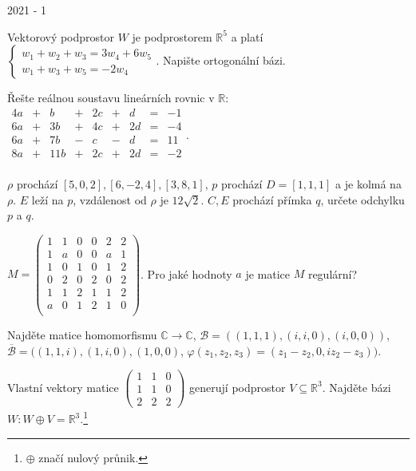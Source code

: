 
\newpage
{\large 2021 - 1}

\begin{questions}

\question Vektorový podprostor \(W\) je podprostorem \(\mathbb{R}^5\) a platí \(\left\{
    \begin{array}{l}
        w_1 + w_2 + w_3 = 3w_4 + 6w_5\\
        w_1 + w_3 + w_5 = -2w_4
    \end{array}
\right.\). Napište ortogonální bázi.

\question Řešte reálnou soustavu lineárních rovnic v \(\mathbb{R}\): \(\begin{matrix}
    4a & + &   b & + & 2c & + &  d & = & -1\\
    6a & + &  3b & + & 4c & + & 2d & = & -4\\
    6a & + &  7b & - &  c & - &  d & = & 11\\
    8a & + & 11b & + & 2c & + & 2d & = & -2\\
\end{matrix}\).

\newpage
\question \(\rho\) prochází \([5,0,2], [6,-2,4], [3,8,1]\), \(p\) prochází \(D=[1,1,1]\) a je kolmá na \(\rho\). \(E\) leží na \(p\), vzdálenost od \(\rho\) je \(12\sqrt{2}\). \(C, E\) prochází přímka \(q\), určete odchylku \(p\) a \(q\).

\question \(M = \begin{pmatrix}
    1 & 1 & 0 & 0 & 2 & 2\\
    1 & a & 0 & 0 & a & 1\\
    1 & 0 & 1 & 0 & 1 & 2\\
    0 & 2 & 0 & 2 & 0 & 2\\
    1 & 1 & 2 & 1 & 1 & 2\\
    a & 0 & 1 & 2 & 1 & 0\\
\end{pmatrix}\). Pro jaké hodnoty \(a\) je matice \(M\) regulární?

\newpage
\question Najděte matice homomorfismu \(\mathbb{C} \rightarrow \mathbb{C}\), \(\mathcal{B} = ((1,1,1),(i,i,0),(i,0,0))\), \(\overline{\mathcal{B}} = ((1,1,i), (1,i,0), (1,0,0)\), \(\varphi(z_1, z_2, z_3) = (z_1-z_2, 0, iz_2-z_3))\).

\question Vlastní vektory matice \(\begin{pmatrix}
    1 & 1 & 0\\
    1 & 1 & 0\\
    2 & 2 & 2
\end{pmatrix}\) generují podprostor \(V \subseteq \mathbb{R}^3\). Najděte bázi \(W: W \oplus V = \mathbb{R}^3\).\footnote{\(\oplus\) značí nulový průnik.}

\end{questions}

